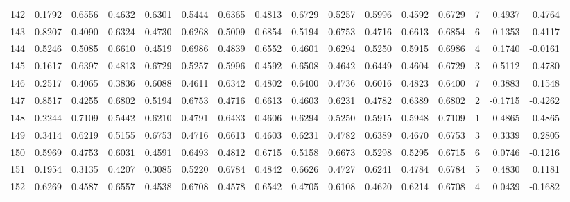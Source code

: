 \begin{tabular}{lrrrrrrrrrrrrrrr}
142 &      0.1792 &  0.6556 &  0.4632 &  0.6301 &  0.5444 &  0.6365 &  0.4813 &  0.6729 &  0.5257 &  0.5996 &   0.4592 &     0.6729 &      7 &                    0.4937 &                     0.4764 \\
143 &      0.8207 &  0.4090 &  0.6324 &  0.4730 &  0.6268 &  0.5009 &  0.6854 &  0.5194 &  0.6753 &  0.4716 &   0.6613 &     0.6854 &      6 &                   -0.1353 &                    -0.4117 \\
144 &      0.5246 &  0.5085 &  0.6610 &  0.4519 &  0.6986 &  0.4839 &  0.6552 &  0.4601 &  0.6294 &  0.5250 &   0.5915 &     0.6986 &      4 &                    0.1740 &                    -0.0161 \\
145 &      0.1617 &  0.6397 &  0.4813 &  0.6729 &  0.5257 &  0.5996 &  0.4592 &  0.6508 &  0.4642 &  0.6449 &   0.4604 &     0.6729 &      3 &                    0.5112 &                     0.4780 \\
146 &      0.2517 &  0.4065 &  0.3836 &  0.6088 &  0.4611 &  0.6342 &  0.4802 &  0.6400 &  0.4736 &  0.6016 &   0.4823 &     0.6400 &      7 &                    0.3883 &                     0.1548 \\
147 &      0.8517 &  0.4255 &  0.6802 &  0.5194 &  0.6753 &  0.4716 &  0.6613 &  0.4603 &  0.6231 &  0.4782 &   0.6389 &     0.6802 &      2 &                   -0.1715 &                    -0.4262 \\
148 &      0.2244 &  0.7109 &  0.5442 &  0.6210 &  0.4791 &  0.6433 &  0.4606 &  0.6294 &  0.5250 &  0.5915 &   0.5948 &     0.7109 &      1 &                    0.4865 &                     0.4865 \\
149 &      0.3414 &  0.6219 &  0.5155 &  0.6753 &  0.4716 &  0.6613 &  0.4603 &  0.6231 &  0.4782 &  0.6389 &   0.4670 &     0.6753 &      3 &                    0.3339 &                     0.2805 \\
150 &      0.5969 &  0.4753 &  0.6031 &  0.4591 &  0.6493 &  0.4812 &  0.6715 &  0.5158 &  0.6673 &  0.5298 &   0.5295 &     0.6715 &      6 &                    0.0746 &                    -0.1216 \\
151 &      0.1954 &  0.3135 &  0.4207 &  0.3085 &  0.5220 &  0.6784 &  0.4842 &  0.6626 &  0.4727 &  0.6241 &   0.4784 &     0.6784 &      5 &                    0.4830 &                     0.1181 \\
152 &      0.6269 &  0.4587 &  0.6557 &  0.4538 &  0.6708 &  0.4578 &  0.6542 &  0.4705 &  0.6108 &  0.4620 &   0.6214 &     0.6708 &      4 &                    0.0439 &                    -0.1682 \\

\end{tabular}
